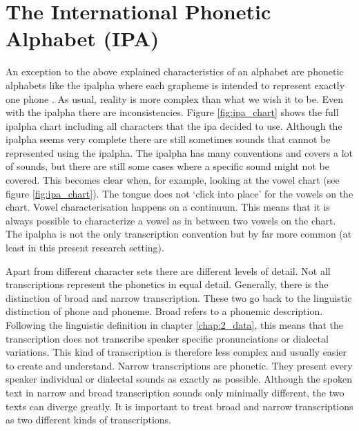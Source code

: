\section{The International Phonetic Alphabet (IPA)}
\label{sec:ipa}
An exception to the above explained characteristics of an alphabet are phonetic alphabets like the \ac{ipalpha} where each grapheme is intended to represent exactly one phone  \citep{writing-systems, Intro.2007}. As usual, reality is more complex than what we wish it to be. Even with the \ac{ipalpha} there are inconsistencies. Figure \ref{fig:ipa_chart} shows the full \ac{ipalpha} chart including all characters that the \ac{ipa} decided to use. Although the \ac{ipalpha} seems very complete there are still sometimes sounds that cannot be represented using the \ac{ipalpha}. The \ac{ipalpha} has many conventions and covers a lot of sounds, but there are still some cases where a specific sound might not be covered. This becomes clear when, for example, looking at the vowel chart (see figure \ref{fig:ipa_chart}). The tongue does not `click into place' for the vowels on the chart. Vowel characterisation happens on a continuum. This means that it is always possible to characterize a vowel as in between two vowels on the chart. The \ac{ipalpha} is not the only transcription convention but by far more common (at least in this present research setting). 


Apart from different character sets there are different levels of detail. Not all transcriptions represent the phonetics in equal detail. Generally, there is the distinction of broad and narrow transcription. These two go back to the linguistic distinction of phone and phoneme. Broad refers to a phonemic description. Following the linguistic definition in chapter \ref{chap:2_data}, this means that the transcription does not transcribe speaker specific pronunciations or dialectal variations. This kind of transcription is therefore less complex and usually easier to create and understand. Narrow transcriptions are phonetic. They present every speaker individual or dialectal sounds as exactly as possible. Although the spoken text in narrow and broad transcription sounds only minimally different, the two texts can diverge greatly. It is important to treat broad and narrow transcriptions as two different kinds of transcriptions. 



\begin{covexamples}
\item \label{exBro} 
\item \label{exNar}
\end{covexamples}

